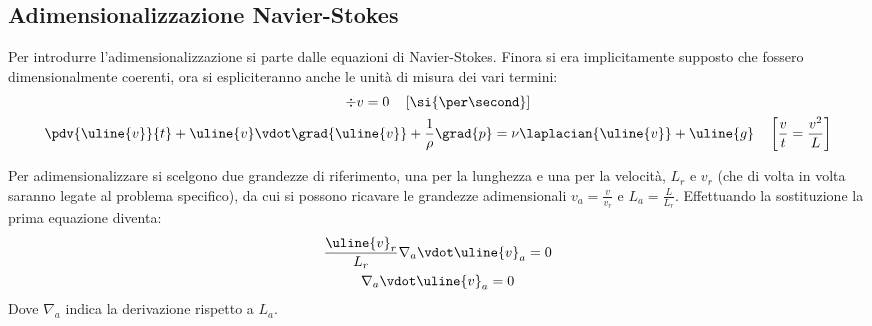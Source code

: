 \subsection{Adimensionalizzazione Navier-Stokes}
Per introdurre l'adimensionalizzazione si parte dalle equazioni di Navier-Stokes.
Finora si era implicitamente supposto che fossero dimensionalmente coerenti, ora si espliciteranno anche le unità di misura dei vari termini:
%
	\begin{equation*}
		\begin{gathered}
			\div{v} = 0 \quad \left[\si{\per \second}\right]\\
			\pdv{\uline{v}}{t} + \uline{v} \vdot \grad{\uline{v}} + \frac{1}{\rho} \grad{p} = \nu \laplacian{\uline{v}} + \uline{g} \quad \left[\frac{v}{t} = \frac{v^2}{L}\right]
		\end{gathered}
	\end{equation*}
%

Per adimensionalizzare si scelgono due grandezze di riferimento, una per la lunghezza e una per la velocità, $L_r$ e $v_r$ (che di volta in volta saranno legate al problema specifico), da cui si possono ricavare le grandezze adimensionali $v_a = \frac{v}{v_r}$ e $L_a = \frac{L}{L_r}$.
Effettuando la sostituzione la prima equazione diventa:
%
	\begin{equation*}
		\begin{gathered}
			\frac{ \uline{v}_r }{L_r} \nabla_a \vdot \uline{v}_a = 0\\
			\nabla_a \vdot \uline{v}_a = 0
		\end{gathered}
	\end{equation*}
%
Dove $\nabla_a$ indica la derivazione rispetto a $L_a$.


